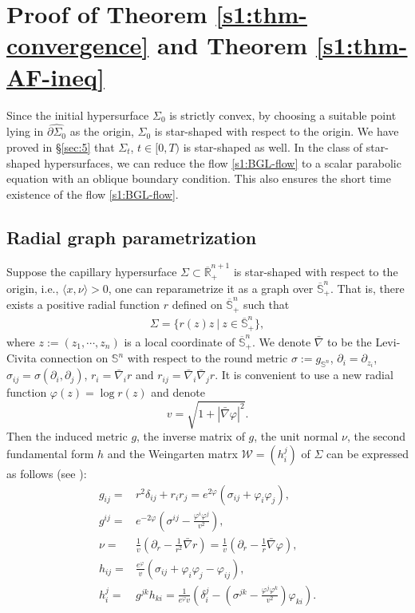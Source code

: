 \documentclass[11pt,reqno]{amsart}
\theoremstyle{definition}
\theoremstyle{remark}
\numberwithin{equation}{section}
\renewcommand{\(}{\left(}
\renewcommand{\)}{\right)}
\renewcommand{\-}{\overline}
\renewcommand{\d}{\delta}
\newcommand{\s}{\sigma}
\begin{document}
\section{Proof of Theorem \ref{s1:thm-convergence} and Theorem \ref{s1:thm-AF-ineq}}\label{sec:6}


Since the initial hypersurface $\Sigma_0$ is strictly convex, by choosing a suitable point lying in $\widehat{\partial\Sigma_0}$ as the origin, $\Sigma_0$ is star-shaped with respect to the origin. We have proved in \S \ref{sec:5} that $\Sigma_t$, $t\in [0,T)$ is star-shaped as well. In the class of star-shaped hypersurfaces, we can reduce the flow \eqref{s1:BGL-flow} to a scalar parabolic equation with an oblique boundary condition. This also ensures the short time existence of the flow \eqref{s1:BGL-flow}.
\subsection{Radial graph parametrization}
Suppose the capillary hypersurface $\Sigma\subset \overline{\mathbb{R}}^{n+1}_+$ is star-shaped with respect to the origin, i.e., $\langle x,\nu\rangle>0$, one can reparametrize it as a graph over $\-{\mathbb S}^n_{+}$. That is, there exists a positive radial function $r$ defined on $\-{\mathbb S}^n_{+}$ such that
\begin{align*}
\Sigma=\{r(z)z~|~z\in\-{\mathbb S}^n_{+}\},
\end{align*}
where $z:=(z_1,\cdots,z_n)$ is a local coordinate of $\-{\mathbb S}^n_{+}$. We denote $\bar{\nabla}$ to be the Levi-Civita connection on $\mathbb S^n$ with respect to the round metric $\s:=g_{\mathbb S^n}$, $\partial_i=\partial_{z_i}$, $\s_{ij}=\s(\partial_i,\partial_j)$, $r_i=\bar{\nabla}_ir$ and $r_{ij}=\bar{\nabla}_i\bar{\nabla}_j r$. It is convenient to use a new radial function  $\varphi(z)=\log r(z)$ and denote
\begin{equation*}
  v=\sqrt{1+|\bar{\nabla}\varphi|^2}.
\end{equation*}
Then the induced metric $g$, the inverse matrix of $g$, the unit normal $\nu$, the second fundamental form $h$ and the Weingarten matrx $\mathcal{W}=(h_i^j)$ of $\Sigma$ can be expressed as follows (see \cite[\S 3]{guan2014}):
\begin{align*}
g_{ij}=&r^2 \d_{ij}+r_ir_j=e^{2\varphi}(\s_{ij}+\varphi_i\varphi_j),\\
g^{ij}=&e^{-2\varphi}\(\s^{ij}-\frac{\varphi^i\varphi^j}{v^2}\),\\
\nu=&\frac{1}{v}\(\partial_r-\frac 1{r^2}\bar{\nabla} r\)=\frac{1}{v}(\partial_r-\frac{1}{r}\bar{\nabla}\varphi),\\
h_{ij}=&\frac{e^\varphi}{v}(\s_{ij}+\varphi_i\varphi_j-\varphi_{ij}),\\
h_i^j=&g^{jk}h_{ki}=\frac{1}{e^\varphi v}\(\d_i^j-(\s^{jk}-\frac{\varphi^j\varphi^k}{v^2})\varphi_{ki} \).
\end{align*}
\end{document}
